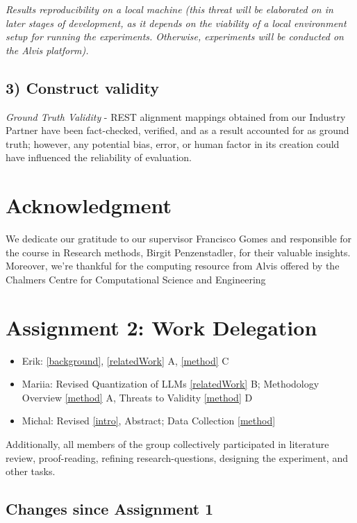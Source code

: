 \documentclass[conference]{IEEEtran}
\begin{document}
    \textit{Results reproducibility on a local machine (this threat will be elaborated on in later stages of development, as it depends on the viability of a local environment setup for running the experiments. Otherwise, experiments will be conducted on the Alvis platform).}

\subsection*{\textbf{3) Construct validity}}
\textit{Ground Truth Validity} - REST alignment mappings obtained from our Industry Partner have been fact-checked, verified, and as a result accounted for as ground truth; however, any potential bias, error, or human factor in its creation could have influenced the reliability of evaluation.

\section*{Acknowledgment}
We dedicate our gratitude to our supervisor Francisco Gomes and responsible for
the course in Research methods, Birgit Penzenstadler, for their valuable
insights. Moreover, we're thankful for the computing resource from Alvis offered
by the Chalmers Centre for Computational Science and Engineering 

\section*{Assignment 2: Work Delegation}

\begin{itemize}
    \item Erik: \ref{background}, \ref{relatedWork} A, \ref{method} C
    \item Mariia: Revised Quantization of LLMs \ref{relatedWork} B; Methodology Overview \ref{method} A, Threats to Validity \ref{method} D 
    \item Michal: Revised \ref{intro}, Abstract; Data Collection \ref{method}
\end{itemize}

\noindent
Additionally, all members of the group collectively participated in literature
review, proof-reading, refining research-questions, designing the experiment, and other tasks.

\subsection*{Changes since Assignment 1}
\end{document}
